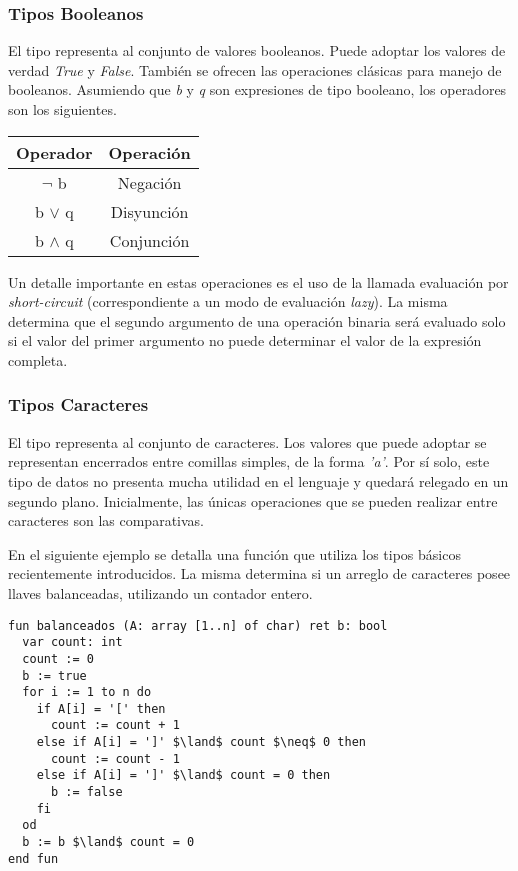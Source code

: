 \documentclass{article}
\begin{document}
\subsubsection{Tipos Booleanos}

El tipo  representa al conjunto de valores booleanos.
Puede adoptar los valores de verdad \textit{True} y \textit{False}.
También se ofrecen las operaciones clásicas para manejo de booleanos.
Asumiendo que \textit{b} y \textit{q} son expresiones de tipo booleano, los operadores son los siguientes.

\begin{center}
\begin{tabular}{| c | c |}
\hline
     Operador & Operación \\
     \hline
     $\neg$ b & Negación \\
     b $\lor$ q & Disyunción \\
     b $\land$ q & Conjunción \\
\hline
\end{tabular}
\end{center}

Un detalle importante en estas operaciones es el uso de la llamada evaluación por \textit{short-circuit} (correspondiente a un modo de evaluación \textit{lazy}).
La misma determina que el segundo argumento de una operación binaria será evaluado solo si el valor del primer argumento no puede determinar el valor de la expresión completa.

\subsubsection{Tipos Caracteres}

El tipo  representa al conjunto de caracteres.
Los valores que puede adoptar se representan encerrados entre comillas simples, de la forma \textit{'a'}.
Por sí solo, este tipo de datos no presenta mucha utilidad en el lenguaje y quedará relegado en un segundo plano.
Inicialmente, las únicas operaciones que se pueden realizar entre caracteres son las comparativas.

En el siguiente ejemplo se detalla una función que utiliza los tipos básicos recientemente introducidos.
La misma determina si un arreglo de caracteres posee llaves balanceadas, utilizando un contador entero.

\begin{lstlisting}
fun balanceados (A: array [1..n] of char) ret b: bool
  var count: int
  count := 0
  b := true
  for i := 1 to n do
    if A[i] = '[' then
      count := count + 1
    else if A[i] = ']' $\land$ count $\neq$ 0 then
      count := count - 1
    else if A[i] = ']' $\land$ count = 0 then
      b := false
    fi
  od
  b := b $\land$ count = 0
end fun
\end{lstlisting}
\end{document}
